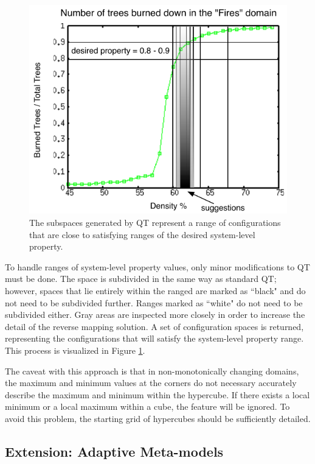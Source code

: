 \begin{figure}[ht]
\centering
\includegraphics[scale=1]{images/QTfiresranges.pdf}
\caption{The subspaces generated by QT represent a range of configurations that are close to satisfying ranges of the desired system-level property.}
\label{fig:qtfiresranges}
\end{figure}
To handle ranges of system-level property values, only minor modifications to QT must be done.
The space is subdivided in the same way as standard QT; however, spaces that lie entirely within the ranged are marked as ``black" and do not need to be subdivided further.
Ranges marked as ``white" do not need to be subdivided either.
Gray areas are inspected more closely in order to increase the detail of the reverse mapping solution.
A set of configuration spaces is returned, representing the configurations that will satisfy the system-level property range.
This process is visualized in Figure \ref{fig:qtfiresranges}.



The caveat with this approach is that in non-monotonically changing domains, the maximum and minimum values at the corners do not necessary accurately describe the maximum and minimum within the hypercube.
If there exists a local minimum or a local maximum within a cube, the feature will be ignored.
To avoid this problem, the starting grid of hypercubes should be sufficiently detailed.



\subsection{Extension: Adaptive Meta-models}

